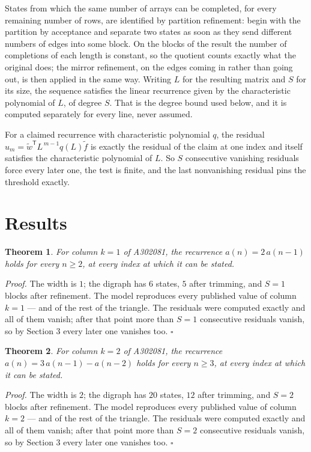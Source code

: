 \documentclass[11pt]{article}
\newtheorem{theorem}{Theorem}
\theoremstyle{definition}
\begin{document}
States from which the same number of arrays can be completed, for every remaining number of rows, are identified by partition refinement: begin with the partition by acceptance and separate two states as soon as they send different numbers of edges into some block. On the blocks of the result the number of completions of each length is constant, so the quotient counts exactly what the original does; the mirror refinement, on the edges coming in rather than going out, is then applied in the same way. Writing $L$ for the resulting matrix and $S$ for its size, the sequence satisfies the linear recurrence given by the characteristic polynomial of $L$, of degree $S$. That is the degree bound used below, and it is computed separately for every line, never assumed.

For a claimed recurrence with characteristic polynomial $q$, the residual $u_m = \tilde w^{\mathsf T}L^{\,m-1}q(L)\tilde f$ is exactly the residual of the claim at one index and itself satisfies the characteristic polynomial of $L$. So $S$ consecutive vanishing residuals force every later one, the test is finite, and the last nonvanishing residual pins the threshold exactly.

\section{Results}

\begin{theorem} For column $k = 1$ of A302081, the recurrence $a(n) = 2\,a(n-1)$ holds for every $n \ge 2$, at every index at which it can be stated.\end{theorem}

{\itshape Proof.} The width is $1$; the digraph has $6$ states, $5$ after trimming, and $S = 1$ blocks after refinement. The model reproduces every published value of column $k = 1$ --- and of the rest of the triangle. The residuals were computed exactly and all of them vanish; after that point more than $S = 1$ consecutive residuals vanish, so by Section 3 every later one vanishes too. $\square$

\begin{theorem} For column $k = 2$ of A302081, the recurrence $a(n) = 3\,a(n-1) - a(n-2)$ holds for every $n \ge 3$, at every index at which it can be stated.\end{theorem}

{\itshape Proof.} The width is $2$; the digraph has $20$ states, $12$ after trimming, and $S = 2$ blocks after refinement. The model reproduces every published value of column $k = 2$ --- and of the rest of the triangle. The residuals were computed exactly and all of them vanish; after that point more than $S = 2$ consecutive residuals vanish, so by Section 3 every later one vanishes too. $\square$
\end{document}
